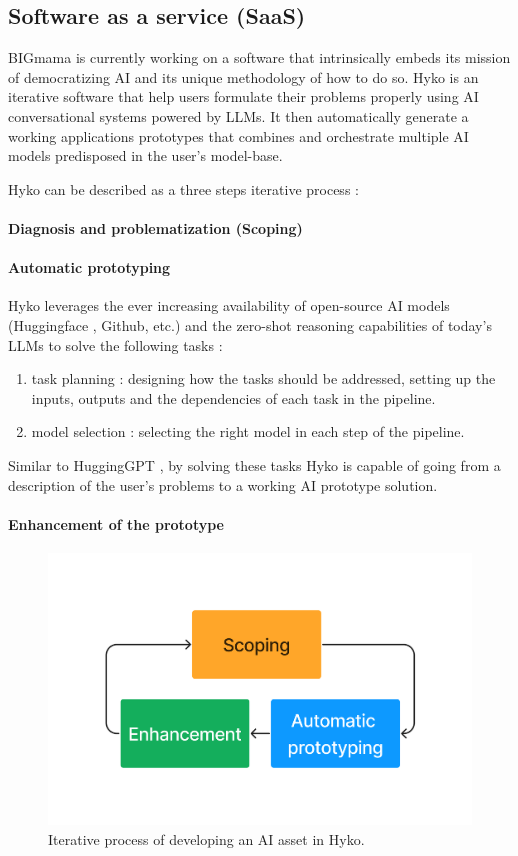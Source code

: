 \documentclass[a4paper,12pt]{article}
\begin{document}
\subsection{Software as a service (SaaS)}
BIGmama is currently working on a software that intrinsically embeds its mission of democratizing AI and its unique methodology of how to do so. Hyko is an iterative software that help users formulate their problems properly using AI conversational systems powered by LLMs. It then automatically generate a working applications prototypes that combines and orchestrate multiple AI models predisposed in the user's model-base.

Hyko can be described as a three steps iterative process :

\paragraph{Diagnosis and problematization (Scoping)}

\paragraph{Automatic prototyping}
Hyko leverages the ever increasing availability of open-source AI models (Huggingface \cite{huggingface}, Github, etc.)
and the zero-shot reasoning capabilities \cite{zeroshot} of today's LLMs to solve the following tasks : 

\begin{enumerate}
    \item task planning : designing how the tasks should be addressed, setting up the inputs, outputs and the dependencies of each task in the pipeline.
    \item model selection : selecting the right model in each step of the pipeline.
\end{enumerate}

Similar to HuggingGPT \cite{hugginggpt}, by solving these tasks Hyko is capable of going from a description of the user's problems to a working AI prototype solution.


\paragraph{Enhancement of the prototype}


\begin{figure}[h]
\centering
\includegraphics[width=.5\linewidth]{figures/3process.png}
\caption{Iterative process of developing an AI asset in Hyko.}
\label{fig:hykoprocess}
\end{figure}
\end{document}
